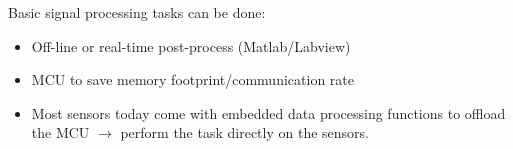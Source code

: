 Basic signal processing tasks can be done:
\begin{itemize}
\item Off-line or real-time post-process (Matlab/Labview)
\item MCU to save memory footprint/communication rate
\item Most sensors today come with embedded data processing
functions to offload the MCU $\rightarrow$ perform the task directly on the sensors.
\end{itemize}

